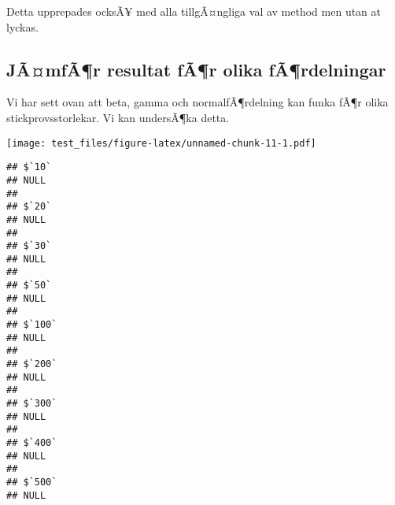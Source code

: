 \documentclass[]{article}
\newenvironment{Shaded}{\begin{snugshade}}{\end{snugshade}}
\newcommand{\KeywordTok}[1]{\textcolor[rgb]{0.13,0.29,0.53}{\textbf{{#1}}}}
\newcommand{\DataTypeTok}[1]{\textcolor[rgb]{0.13,0.29,0.53}{{#1}}}
\newcommand{\DecValTok}[1]{\textcolor[rgb]{0.00,0.00,0.81}{{#1}}}
\newcommand{\StringTok}[1]{\textcolor[rgb]{0.31,0.60,0.02}{{#1}}}
\newcommand{\NormalTok}[1]{{#1}}
\begin{document}
Detta upprepades ocksÃ¥ med alla tillgÃ¤ngliga val av method men utan at
lyckas.

\subsection{JÃ¤mfÃ¶r resultat fÃ¶r olika
fÃ¶rdelningar}\label{jamfar-resultat-far-olika-fardelningar}

Vi har sett ovan att beta, gamma och normalfÃ¶rdelning kan funka fÃ¶r
olika stickprovsstorlekar. Vi kan undersÃ¶ka detta.

\begin{Shaded}
\end{Shaded}

\texttt{[image: test\_files/figure-latex/unnamed-chunk-11-1.pdf]}

\begin{verbatim}
## $`10`
## NULL
## 
## $`20`
## NULL
## 
## $`30`
## NULL
## 
## $`50`
## NULL
## 
## $`100`
## NULL
## 
## $`200`
## NULL
## 
## $`300`
## NULL
## 
## $`400`
## NULL
## 
## $`500`
## NULL
\end{verbatim}
\end{document}
